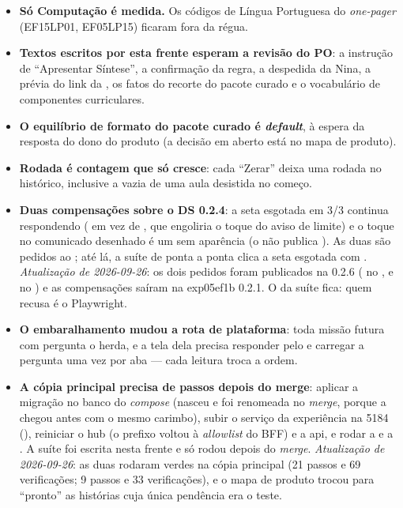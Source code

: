 \begin{itemize}
  \item \textbf{Só Computação é medida.} Os códigos de Língua Portuguesa do
    \emph{one-pager} (EF15LP01, EF05LP15) ficaram fora da régua.
  \item \textbf{Textos escritos por esta frente esperam a revisão do PO}: a
    instrução de \enquote{Apresentar Síntese}, a confirmação da regra, a
    despedida da Nina, a prévia do link da , os fatos do recorte do
    pacote curado e o vocabulário de componentes curriculares.
  \item \textbf{O equilíbrio de formato do pacote curado é \emph{default}}, à
    espera da resposta do dono do produto (a decisão em aberto está no mapa de
    produto).
  \item \textbf{Rodada é contagem que só cresce}: cada \enquote{Zerar} deixa
    uma rodada no histórico, inclusive a vazia de uma aula desistida no começo.
  \item \textbf{Duas compensações sobre o DS 0.2.4}: a seta esgotada em 3/3
    continua respondendo ( em vez de , que
    engoliria o toque do aviso de limite) e o toque no comunicado desenhado é um
     sem aparência (o  não publica ). As duas
    são pedidos ao ; até lá, a suíte de ponta a ponta
    clica a seta esgotada com . \emph{Atualização de 2026-09-26}: os
    dois pedidos foram publicados na 0.2.6 ( no
    ,  e  no ) e as
    compensações saíram na exp05ef1b 0.2.1. O  da suíte fica: quem
    recusa  é o Playwright.
  \item \textbf{O embaralhamento mudou a rota de plataforma}: toda missão futura
    com pergunta o herda, e a tela dela precisa responder pelo  e carregar
    a pergunta uma vez por aba --- cada leitura troca a ordem.
  \item \textbf{A cópia principal precisa de passos depois do merge}: aplicar a
    migração  no banco do \emph{compose} (nasceu
     e foi renomeada no \emph{merge}, porque a
     chegou antes com o mesmo carimbo), subir o serviço da
    experiência na 5184 (), reiniciar o hub (o prefixo
     voltou à \emph{allowlist} do BFF) e a api, e rodar a
     e a . A suíte foi
    escrita nesta frente e só rodou depois do \emph{merge}. \emph{Atualização de
    2026-09-26}: as duas rodaram verdes na cópia principal (21 passos e 69
    verificações; 9 passos e 33 verificações), e o mapa de produto trocou para
    \enquote{pronto} as histórias cuja única pendência era o teste.
\end{itemize}

